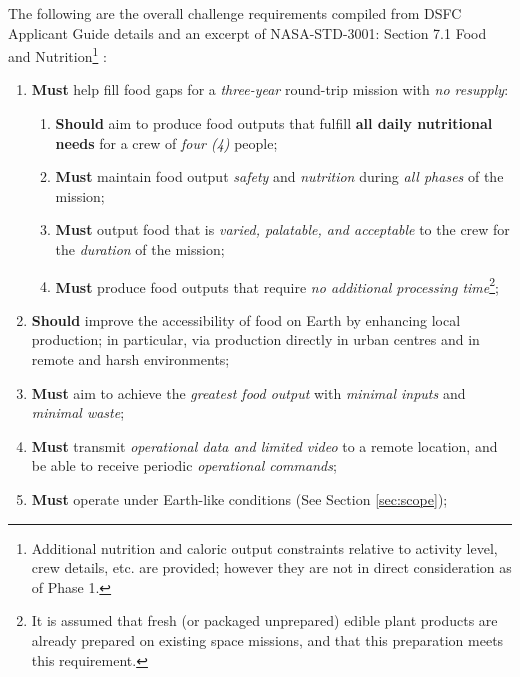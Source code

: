 \documentclass{report}
\begin{document}
The following are the overall challenge requirements compiled from DSFC Applicant Guide details \cite{applicantguide} and an excerpt of NASA-STD-3001: Section 7.1 Food and Nutrition\footnote{Additional nutrition and caloric output constraints relative to activity level, crew details, etc. are provided; however they are not in direct consideration as of Phase 1.} \cite{nutrition}:
\begin{enumerate}[label=R\arabic*., ref=R\arabic*]
    \item \label{r:1} \textbf{Must} help fill food gaps for a \textit{three-year} round-trip mission with \textit{no resupply}:
    \begin{enumerate}[ref=R1\alph*]
        \item \label{r:1a} \textbf{Should} aim to produce food outputs that fulfill \textbf{all daily nutritional needs} for a crew of \textit{four (4)} people;
        \item \label{r:1b} \textbf{Must} maintain food output \textit{safety} and \textit{nutrition} during \textit{all phases} of the mission;
        \item \label{r:1c} \textbf{Must} output food that is \textit{varied, palatable, and acceptable} to the crew for the \textit{duration} of the mission;
        \item \label{r:1d} \textbf{Must} produce food outputs that require \textit{no additional processing 
        time}\footnote{It is assumed that fresh (or packaged unprepared) edible plant products are already prepared on existing space missions, and that this preparation meets this requirement.};
    \end{enumerate}
    \item \label{r:2} \textbf{Should} improve the accessibility of food on Earth by enhancing local production; in particular, via production directly in urban centres and in remote and harsh environments;
    \item \label{r:3} \textbf{Must} aim to achieve the \textit{greatest food output} with \textit{minimal inputs} and \textit{minimal waste};
    \item \label{r:4} \textbf{Must} transmit \textit{operational data and limited video} to a remote location, and be able to receive periodic \textit{operational commands};
    \item \label{r:5} \textbf{Must} operate under Earth-like conditions (See Section \ref{sec:scope});
\end{enumerate}
\end{document}
